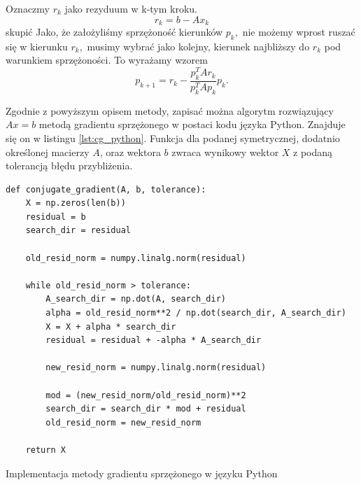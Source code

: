 \documentclass[a4paper,12pt]{book} %
\begin{document}
Oznaczmy $r_k$ jako rezyduum w k-tym kroku.
$$r_k = b - Ax_k$$skupić
Jako, że założyliśmy sprzężoność kierunków $p_k,$ nie możemy wprost ruszać się w kierunku $r_k,$ musimy wybrać jako kolejny, kierunek najbliższy do $r_k$ pod warunkiem sprzężoności. To wyrażamy wzorem
$$p_{k+1} = r_k - \frac{p_k^TAr_k}{p_k^TAp_k}p_k.$$ 








Zgodnie z powyższym opisem metody, zapisać można algorytm rozwiązujący $Ax = b$ metodą gradientu sprzężonego w postaci kodu języka Python. Znajduje się on w listingu \ref{lst:cg_python}. Funkcja dla podanej symetrycznej, dodatnio określonej macierzy $A$, oraz wektora $b$ zwraca wynikowy wektor $X$ z podaną tolerancją błędu przybliżenia.

\begin{lstfloat}[H]
\lstset{language=Python}
\begin{lstlisting}[frame=single]
def conjugate_gradient(A, b, tolerance):
    X = np.zeros(len(b))
    residual = b
    search_dir = residual

    old_resid_norm = numpy.linalg.norm(residual)

    while old_resid_norm > tolerance:
        A_search_dir = np.dot(A, search_dir)
        alpha = old_resid_norm**2 / np.dot(search_dir, A_search_dir)
        X = X + alpha * search_dir
        residual = residual + -alpha * A_search_dir

        new_resid_norm = numpy.linalg.norm(residual)

        mod = (new_resid_norm/old_resid_norm)**2
        search_dir = search_dir * mod + residual
        old_resid_norm = new_resid_norm

    return X
\end{lstlisting}
\caption{Implementacja metody gradientu sprzężonego w języku Python}
\label{lst:cg_python}
\end{lstfloat}
\end{document}

